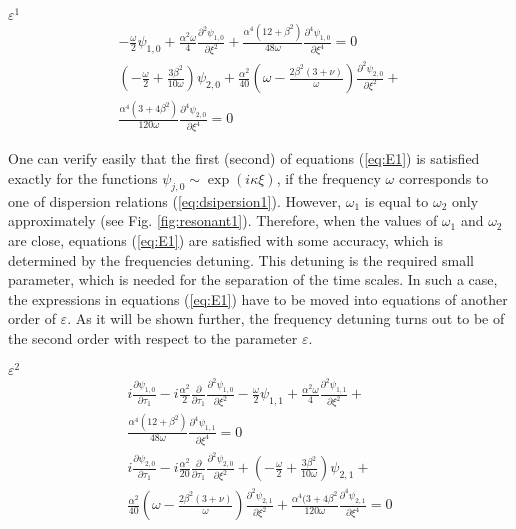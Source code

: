 $\varepsilon^1$
\begin{eqnarray}\label{eq:E1}
-  \frac{\omega}{2}   \psi_{1,0}+\frac{\alpha^2 \omega }{4} \frac{\partial^2 \psi_{1,0}}{\partial \xi^2}+\frac{\alpha^4 (12+\beta^2)}{48\omega} \frac{\partial^4 \psi_{1,0}}{\partial \xi^4 }=0  \nonumber  \\
\left( -  \frac{\omega}{2}+\frac{3 \beta^2}{10 \omega} \right)   \psi_{2,0}+\frac{\alpha^2}{40} \left( \omega-\frac{2 \beta^2 (3+\nu)}{\omega} \right) \frac{\partial^2 \psi_{2,0}}{\partial \xi^2} +   \\
\frac{\alpha^4 (3+4 \beta^2)}{120 \omega} \frac{\partial^4 \psi_{2,0}}{\partial \xi^4} = 0 \nonumber 
\end{eqnarray}

One can  verify easily that the first (second) of  equations (\ref{eq:E1}) is satisfied exactly for the functions $\psi_{j,0} \sim \exp(i \kappa \xi)$, if  the frequency $\omega$ corresponds to  one of  dispersion relations (\ref{eq:dsipersion1}).
However, $\omega_{1}$ is equal to $\omega_{2}$ only approximately (see Fig. \ref{fig:resonant1}).
Therefore, when the values of $\omega_{1}$ and $\omega_{2}$ are close, equations (\ref{eq:E1}) are satisfied with some accuracy, which is determined by the frequencies detuning.
This detuning is the required small parameter, which is needed for the separation of the time scales.
In such a case, the expressions in equations (\ref{eq:E1}) have to be moved into equations of another order of $\varepsilon$.
As it will be shown further, the frequency detuning turns out to be of the second order with respect to the parameter $\varepsilon$.

$\varepsilon^2$
\begin{eqnarray}\label{eq:E2}
i \frac{\partial \psi_{1,0}}{\partial \tau_{1}}   - i\frac{\alpha^2}{2} \frac{\partial }{\partial \tau_{1}} \frac{\partial^2 \psi_{1,0}}{\partial \xi^2}-  \frac{\omega}{2}  \psi_{1,1}+\frac{\alpha^2 \omega }{4} \frac{\partial^2 \psi_{1,1}}{\partial \xi^2}+   \nonumber  \\\frac{\alpha^4 (12+\beta^2)}{48\omega} \frac{\partial^4 \psi_{1,1}}{\partial \xi^4 }=0  \\
i \frac{\partial \psi_{2,0}}{\partial \tau_{1}}   - i\frac{\alpha^2}{20} \frac{\partial }{\partial \tau_{1}} \frac{\partial^2 \psi_{2,0}}{\partial \xi^2} + \left( -  \frac{\omega}{2}+\frac{3 \beta^2}{10 \omega} \right)  \psi_{2,1}+  \nonumber   \\  \frac{\alpha^2}{40}   \left( \omega-\frac{2 \beta^2 (3+\nu)}{\omega} \right) \frac{\partial^2 \psi_{2,1}}{\partial \xi^2} +  \frac{\alpha^4 (3+4 \beta^2}{120 \omega} \frac{\partial^4 \psi_{2,1}}{\partial \xi^4} = 0   \nonumber
\end{eqnarray}

